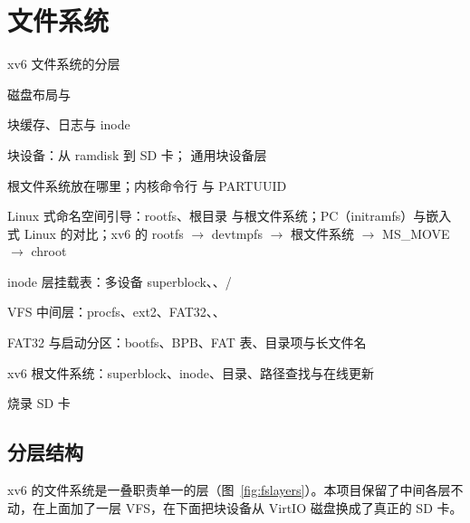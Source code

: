 \chapter{文件系统}
\label{chap:fs}

\begin{introduction}[本章内容]
  \item xv6 文件系统的分层
  \item 磁盘布局与 
  \item 块缓存、日志与 inode
  \item 块设备：从 ramdisk 到 SD 卡； 通用块设备层
  \item 根文件系统放在哪里；内核命令行  与 PARTUUID
  \item Linux 式命名空间引导：rootfs、根目录 \code{/} 与根文件系统；PC（initramfs）与嵌入式 Linux 的对比；xv6 的 rootfs $\to$ devtmpfs $\to$ 根文件系统 $\to$ MS\_MOVE $\to$ chroot
  \item inode 层挂载表：多设备 superblock、、/
  \item VFS 中间层：procfs、ext2、FAT32、、
  \item FAT32 与启动分区：bootfs、BPB、FAT 表、目录项与长文件名
  \item xv6 根文件系统：superblock、inode、目录、路径查找与在线更新
  \item 烧录 SD 卡
\end{introduction}

\section{分层结构}

xv6 的文件系统是一叠职责单一的层（图~\ref{fig:fslayers}）。本项目保留了中间各层不动，在上面加了一层 VFS，在下面把块设备从 VirtIO 磁盘换成了真正的 SD 卡。

